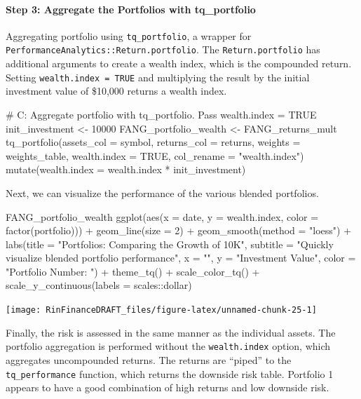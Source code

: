 \paragraph{Step 3: Aggregate the Portfolios with
tq\_portfolio}\label{step-3-aggregate-the-portfolios-with-tq_portfolio}

Aggregating portfolio using \texttt{tq\_portfolio}, a wrapper for
\texttt{PerformanceAnalytics::Return.portfolio}. The
\texttt{Return.portfolio} has additional arguments to create a wealth
index, which is the compounded return. Setting
\texttt{wealth.index\ =\ TRUE} and multiplying the result by the initial
investment value of \$10,000 returns a wealth index.

\begin{Schunk}
\begin{Sinput}
# C: Aggregate portfolio with tq_portfolio. Pass wealth.index = TRUE
init_investment <- 10000
FANG_portfolio_wealth <- FANG_returns_mult %
    tq_portfolio(assets_col = symbol, returns_col = returns,
                 weights = weights_table, wealth.index = TRUE,
                 col_rename = "wealth.index") %
    mutate(wealth.index = wealth.index * init_investment)
\end{Sinput}
\end{Schunk}

Next, we can visualize the performance of the various blended
portfolios.

\begin{Schunk}
\begin{Sinput}
FANG_portfolio_wealth  %
    ggplot(aes(x = date, y = wealth.index, color = factor(portfolio))) +
    geom_line(size = 2) +
    geom_smooth(method = "loess") +
    labs(title = "Portfolios: Comparing the Growth of 10K",
         subtitle = "Quickly visualize blended portfolio performance",
         x = "", y = "Investment Value",
         color = "Portfolio Number: ") +
    theme_tq() +
    scale_color_tq() +
    scale_y_continuous(labels = scales::dollar)
\end{Sinput}


\begin{center}\texttt{[image: RinFinanceDRAFT\_files/figure-latex/unnamed-chunk-25-1]} \end{center}

\end{Schunk}

Finally, the risk is assessed in the same manner as the individual
assets. The portfolio aggregation is performed without the
\texttt{wealth.index} option, which aggregates uncompounded returns. The
returns are ``piped'' to the \texttt{tq\_performance} function, which
returns the downside risk table. Portfolio 1 appears to have a good
combination of high returns and low downside risk.

